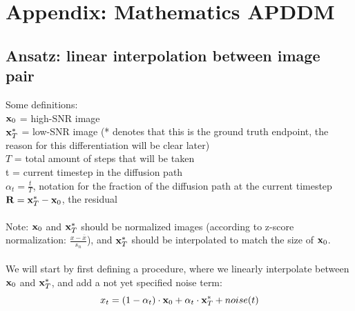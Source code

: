 \documentclass[twocolumn]{article}
\begin{document}
\begin{appendices}
\begin{ganttchart}
\end{ganttchart}

\newpage
\section{Appendix: Mathematics APDDM}
\label{appendix:Mathematics APDDM}
\subsection{Ansatz: linear interpolation between image pair}
Some definitions:
\\
$\bold{x}_0$ = high-SNR image\\
$\bold{x}_T^*$ = low-SNR image (* denotes that this is the ground truth endpoint, the reason for this differentiation will be clear later)\\
$T$ = total amount of steps that will be taken\\
t = current timestep in the diffusion path \\
$\alpha_t = \frac{t}{T}$, notation for the fraction of the diffusion path at the current timestep\\
$\bold{R} = \bold{x}_T^* - \bold{x}_0$, the residual\\
\\
Note: $\bold{x}_0$ and $\bold{x}_T^*$ should be normalized images (according to z-score normalization: 
$\frac{x - \overline{x}}{s_n}$), and $\bold{x}_T^*$ should be interpolated to match the size of $\bold{x}_0$.\\
\\
We will start by first defining a procedure, where we linearly interpolate between $\bold{x}_0$ and $\bold{x}_T^*$, and add a not yet specified noise term:
\begin{equation}
    x_t = (1-\alpha_t)\cdot\bold{x}_0 + \alpha_t\cdot\bold{x}_T^* + noise(t)
\end{equation}


\end{appendices}
\end{document}

